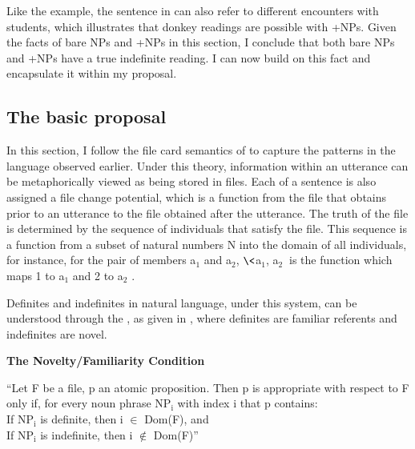\documentclass[output=paper,
modfonts
]{langscibook}
\begin{document}
Like the  example, the sentence in  can also refer to different encounters with students, which illustrates that donkey readings are possible with +NPs. Given the facts of bare NPs and +NPs in this section, I conclude that both bare NPs and +NPs have a true indefinite reading. I can now build on this fact and encapsulate it within my proposal. 

\subsection{The basic proposal}\label{sec:irani:4.2} 

In this section, I follow the file card semantics of \citet{Heim1983} to capture the patterns in the language observed earlier. Under this theory, information within an utterance can be metaphorically viewed as being stored in files. Each  of a sentence is also assigned a file change potential, which is a function from the file that obtains prior to an utterance to the file obtained after the utterance. The truth of the file is determined by the sequence of individuals that satisfy the file. This sequence is a function from a subset of natural numbers N into the domain of all individuals, for instance, for the pair of members a$_{1}$ and a$_{2}$, $\<$a$_{1}$, a$_{2}\>$ is the function which maps 1 to a$_{1}$ and 2 to a$_{2}$ \citep[228]{Heim1983}. 


Definites and indefinites in natural language, under this system, can be understood through the , as given in , where definites are familiar referents and indefinites are novel.

\begin{exe}
\ex \label{ex:irani:42} \textbf{The Novelty/Familiarity Condition}

``Let F be a file, p an atomic proposition. Then p is appropriate with respect to F only if, for every noun phrase NP$_\text{i}$ with index i that p contains:\\
\indent 	If NP$_\text{i}$ is definite, then i \(\in\) Dom(F), and \\
\indent 	If NP$_\text{i}$ is indefinite, then i \(\notin\) Dom(F)'' \cite[233]{Heim1983} 
\end{exe}
\end{document}
